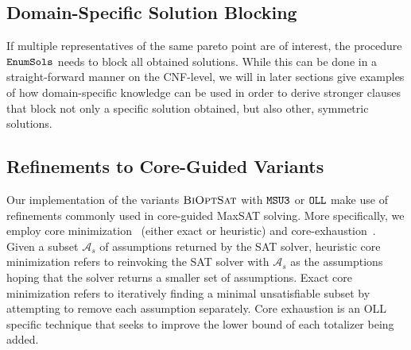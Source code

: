 \subsection{Domain-Specific Solution Blocking}

If multiple representatives of the same pareto point are of interest, the procedure $\texttt{EnumSols}$ needs to block all obtained solutions. 
While this can be done in a straight-forward manner on the CNF-level, we will in later sections give examples of how domain-specific knowledge can be used in order to derive stronger clauses that block not only a specific solution obtained, but also other, symmetric solutions.

\subsection{Refinements to Core-Guided Variants}

Our implementation of the variants $\textsc{BiOptSat}$ with $\texttt{MSU3}$ or $\texttt{OLL}$ make use of refinements commonly used in core-guided MaxSAT solving.
More specifically, we employ core minimization~\autocite{DBLP:journals/jsat/IgnatievMM19} (either exact or heuristic) and core-exhaustion~\autocite{DBLP:journals/jsat/IgnatievMM19,DBLP:conf/cp/AnsoteguiBGL13}.
Given a subset $\mathcal{A}_s$ of assumptions returned by the SAT solver, heuristic core minimization refers to reinvoking the SAT solver with $\mathcal{A}_s$ as the assumptions hoping that the solver returns a smaller set of assumptions.
Exact core minimization refers to iteratively finding a minimal unsatisfiable subset by attempting to remove each assumption separately.
Core exhaustion is an OLL specific technique that seeks to improve the lower bound of each totalizer being added.
